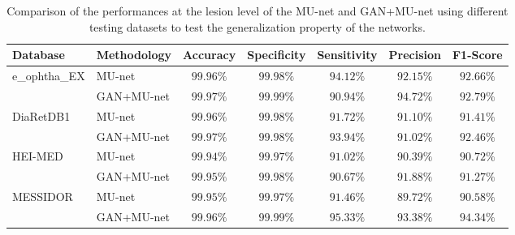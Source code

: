 \documentclass{osa-article}
\begin{document}
\begin{table}[htbp]
\centering
\caption{Comparison of the performances at the lesion level of the MU-net and GAN+MU-net using different testing datasets to test the generalization property of the networks.} 
\begin{tabular}{llccccc}
\hline
Database & Methodology &  Accuracy & Specificity & Sensitivity & Precision & F1-Score  \\
\hline
e\_ophtha\_EX & MU-net & $99.96\%$ & $99.98\%$ & $\bm{94.12\%}$ & $92.15\%$ & $92.66\%$\\
        & GAN+MU-net & $\bm{99.97\%}$ & $\bm{99.99\%}$ & $90.94\%$ & $\bm{94.72\%}$ & $\bm{92.79\%}$ \\
\hline
DiaRetDB1 & MU-net & $99.96\%$ & $99.98\%$ & $91.72\%$ & $\bm{91.10\%}$ & $91.41\%$ \\
        & GAN+MU-net & $\bm{99.97\%}$ & $99.98\%$ & $\bm{93.94\%}$ & $91.02\%$ & $\bm{92.46\%}$ \\
\hline
HEI-MED & MU-net & $99.94\%$ & $99.97\%$ & $91.02\%$ & $90.39\%$ & $90.72\%$ \\
       & GAN+MU-net & $\bm{99.95\%}$ & $\bm{99.98\%}$ & $\bm{90.67\%}$ & $\bm{91.88\%}$ & $\bm{91.27\%}$\\
\hline
MESSIDOR & MU-net & $99.95\%$ & $99.97\%$ & $91.46\%$ & $89.72\%$ & $90.58\%$ \\
        & GAN+MU-net & $\bm {99.96\%}$ & $\bm{99.99\%}$ & $\bm{95.33\%}$ & $\bm{93.38\%}$ & $\bm{94.34\%}$ \\
\hline
\end{tabular}
\label{tab:comparison of performances on different training set on pixel level}
\end{table}
\end{document}
